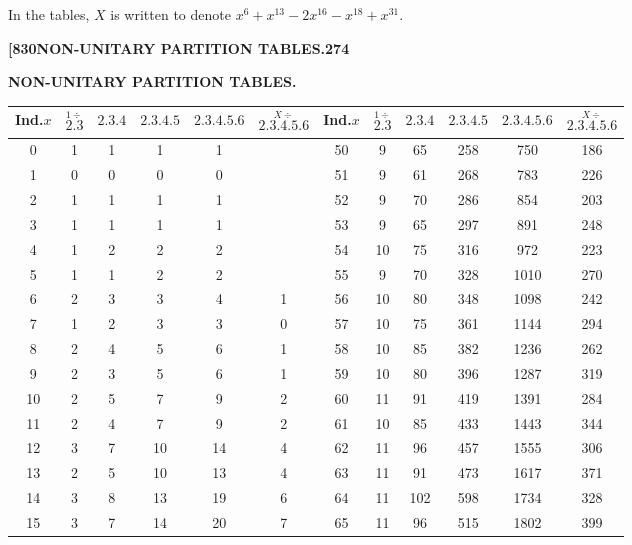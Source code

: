 \documentclass[11pt,a4paper]{book}
\begin{document}
In the tables, $X$ is written to denote $x^6 + x^{13} - 2x^{16} - x^{18} + x^{31}$.

\newpage
\setcounter{page}{274}

\noindent\textbf{[830}\hfill\textbf{NON-UNITARY PARTITION TABLES.}\hfill\textbf{274}

\bigskip

\begin{center}
\textbf{NON-UNITARY PARTITION TABLES.}
\end{center}

\begin{center}
\small
\begin{tabular}{|c|c|c|c|c|c||c|c|c|c|c|c|}
\hline
Ind.$x$ & $\stackrel{1\div}{\mathbf{2.3}}$ & $\mathbf{2.3.4}$ & $\mathbf{2.3.4.5}$ & $\mathbf{2.3.4.5.6}$ & $\stackrel{X\div}{\mathbf{2.3.4.5.6}}$ & Ind.$x$ & $\stackrel{1\div}{\mathbf{2.3}}$ & $\mathbf{2.3.4}$ & $\mathbf{2.3.4.5}$ & $\mathbf{2.3.4.5.6}$ & $\stackrel{X\div}{\mathbf{2.3.4.5.6}}$ \\
\hline
0 & 1 & 1 & 1 & 1 & & 50 & 9 & 65 & 258 & 750 & 186 \\
1 & 0 & 0 & 0 & 0 & & 51 & 9 & 61 & 268 & 783 & 226 \\
2 & 1 & 1 & 1 & 1 & & 52 & 9 & 70 & 286 & 854 & 203 \\
3 & 1 & 1 & 1 & 1 & & 53 & 9 & 65 & 297 & 891 & 248 \\
4 & 1 & 2 & 2 & 2 & & 54 & 10 & 75 & 316 & 972 & 223 \\
5 & 1 & 1 & 2 & 2 & & 55 & 9 & 70 & 328 & 1010 & 270 \\
6 & 2 & 3 & 3 & 4 & 1 & 56 & 10 & 80 & 348 & 1098 & 242 \\
7 & 1 & 2 & 3 & 3 & 0 & 57 & 10 & 75 & 361 & 1144 & 294 \\
8 & 2 & 4 & 5 & 6 & 1 & 58 & 10 & 85 & 382 & 1236 & 262 \\
9 & 2 & 3 & 5 & 6 & 1 & 59 & 10 & 80 & 396 & 1287 & 319 \\
10 & 2 & 5 & 7 & 9 & 2 & 60 & 11 & 91 & 419 & 1391 & 284 \\
11 & 2 & 4 & 7 & 9 & 2 & 61 & 10 & 85 & 433 & 1443 & 344 \\
12 & 3 & 7 & 10 & 14 & 4 & 62 & 11 & 96 & 457 & 1555 & 306 \\
13 & 2 & 5 & 10 & 13 & 4 & 63 & 11 & 91 & 473 & 1617 & 371 \\
14 & 3 & 8 & 13 & 19 & 6 & 64 & 11 & 102 & 598 & 1734 & 328 \\
15 & 3 & 7 & 14 & 20 & 7 & 65 & 11 & 96 & 515 & 1802 & 399 \\

\end{tabular}
\end{center}
\end{document}
